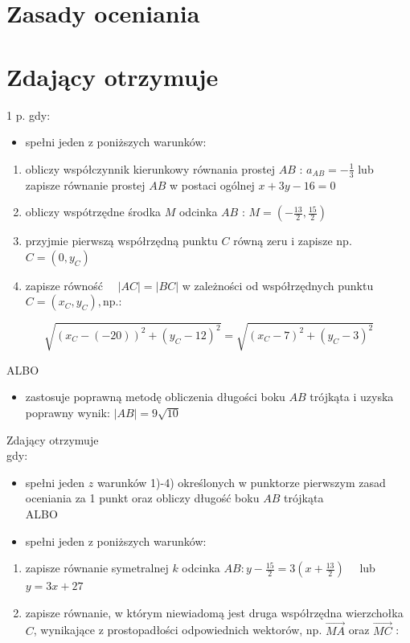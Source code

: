 \documentclass[10pt]{article}
\begin{document}
\section*{Zasady oceniania}
\section*{Zdający otrzymuje}
 1 p. gdy:\begin{itemize}
  \item spełni jeden z poniższych warunków:
\end{itemize}

\begin{enumerate}
  \item obliczy współczynnik kierunkowy równania prostej $A B$ : $a_{A B}=-\frac{1}{3}$ lub zapisze równanie prostej $A B$ w postaci ogólnej $x+3 y-16=0$
  \item obliczy wspótrzędne środka $M$ odcinka $A B$ : $M=\left(-\frac{13}{2}, \frac{15}{2}\right)$
  \item przyjmie pierwszą współrzędną punktu $C$ równą zeru i zapisze np. $C=\left(0, y_{C}\right)$
  \item zapisze równość $\quad|A C|=|B C|$ w zależności od współrzędnych punktu $C=\left(x_{C}, y_{C}\right), \mathrm{np}$.:
\end{enumerate}

$$
\sqrt{\left(x_{C}-(-20)\right)^{2}+\left(y_{C}-12\right)^{2}}=\sqrt{\left(x_{C}-7\right)^{2}+\left(y_{C}-3\right)^{2}}
$$

ALBO

\begin{itemize}
  \item zastosuje poprawną metodę obliczenia długości boku $A B$ trójkąta i uzyska poprawny wynik: $|A B|=9 \sqrt{10}$
\end{itemize}

Zdający otrzymuje\\
gdy:

\begin{itemize}
  \item spełni jeden $z$ warunków 1)-4) określonych w punktorze pierwszym zasad oceniania za 1 punkt oraz obliczy długość boku $A B$ trójkąta\\
ALBO
  \item spełni jeden z poniższych warunków:
\end{itemize}

\begin{enumerate}
  \item zapisze równanie symetralnej $k$ odcinka $A B: y-\frac{15}{2}=3\left(x+\frac{13}{2}\right) \quad$ lub $y=3 x+27$
  \item zapisze równanie, w którym niewiadomą jest druga współrzędna wierzchołka $C$, wynikające z prostopadłości odpowiednich wektorów, np. $\overrightarrow{M A}$ oraz $\overrightarrow{M C}$ :
\end{enumerate}
\end{document}
